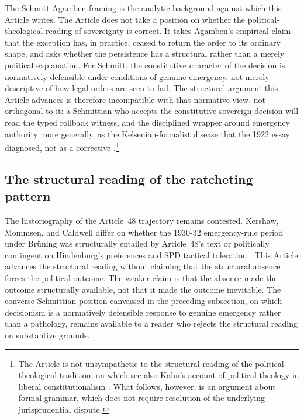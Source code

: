 The Schmitt-Agamben framing is the analytic background against which this Article writes.
The Article does not take a position on whether the political-theological reading of sovereignty is correct.
It takes Agamben's empirical claim that the exception has, in practice, ceased to return
the order to its ordinary shape,
and asks whether the persistence has a structural rather than a merely political explanation.
For Schmitt, the constitutive character of the decision is normatively defensible under conditions of genuine
emergency, not merely descriptive of how legal orders are seen to fail.
The structural argument this Article advances is therefore incompatible with that normative view,
not orthogonal to it: a Schmittian who accepts the constitutive sovereign decision will read the
typed rollback witness, and the disciplined wrapper around emergency authority more generally,
as the Kelsenian-formalist disease that the 1922 essay diagnosed, not as a corrective
\cite{TODO_caldwell_popular_sovereignty,TODO_dyzenhaus_legality_legitimacy}.\footnote{%
The Article is not unsympathetic to the structural reading of the political-theological tradition,
on which see also Kahn's account of political theology in liberal constitutionalism \cite{TODO_kahn_political_theology}.
What follows, however, is an argument about formal grammar,
which does not require resolution of the underlying jurisprudential dispute.}

\subsection{The structural reading of the ratcheting pattern}

The historiography of the Article~48 trajectory remains contested.
Kershaw, Mommsen, and Caldwell differ on whether the 1930-32 emergency-rule period under Br\"uning
was structurally entailed by Article~48's text or politically contingent on Hindenburg's preferences
and SPD tactical toleration
\cite{TODO_kershaw_hitler,TODO_mommsen_weimar,TODO_caldwell_popular_sovereignty}.
This Article advances the structural reading without claiming that the structural absence forces the political outcome.
The weaker claim is that the absence made the outcome structurally available, not that it made the outcome inevitable.
The converse Schmittian position canvassed in the preceding subsection,
on which decisionism is a normatively defensible response to genuine emergency rather than a pathology,
remains available to a reader who rejects the structural reading on substantive grounds.

